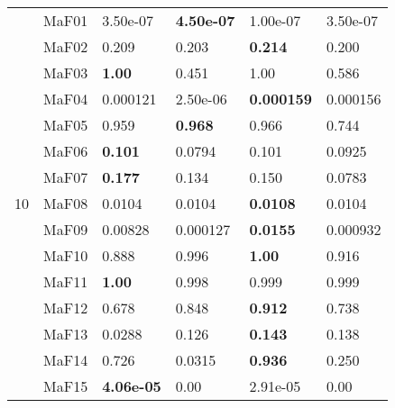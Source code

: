 \documentclass[]{article}
\begin{document}
\begin{table}
\begin{footnotesize}
\begin{tabular}{|l|l|l|l|l|l|}
\multirow{15}{*}{10} & MaF01 & \cellcolor{gray95} 3.50e-07 & \cellcolor{gray95} {\bf 4.50e-07} & \cellcolor{gray95} 1.00e-07 & \cellcolor{gray95} 3.50e-07\\
 & MaF02 & \cellcolor{gray95} 0.209 & 0.203 & \cellcolor{gray95} {\bf 0.214} & 0.200\\
 & MaF03 & \cellcolor{gray95} {\bf 1.00} & 0.451 & \cellcolor{gray95} 1.00 & 0.586\\
 & MaF04 & \cellcolor{gray95} 0.000121 & 2.50e-06 & \cellcolor{gray95} {\bf 0.000159} & \cellcolor{gray95} 0.000156\\
 & MaF05 & 0.959 & \cellcolor{gray95} {\bf 0.968} & \cellcolor{gray95} 0.966 & 0.744\\
 & MaF06 & \cellcolor{gray95} {\bf 0.101} & 0.0794 & \cellcolor{gray95} 0.101 & 0.0925\\
 & MaF07 & \cellcolor{gray95} {\bf 0.177} & 0.134 & 0.150 & 0.0783\\
 & MaF08 & \cellcolor{gray95} 0.0104 & 0.0104 & \cellcolor{gray95} {\bf 0.0108} & 0.0104\\
 & MaF09 & \cellcolor{gray95} 0.00828 & 0.000127 & \cellcolor{gray95} {\bf 0.0155} & 0.000932\\
 & MaF10 & 0.888 & 0.996 & \cellcolor{gray95} {\bf 1.00} & 0.916\\
 & MaF11 & \cellcolor{gray95} {\bf 1.00} & 0.998 & 0.999 & 0.999\\
 & MaF12 & 0.678 & 0.848 & \cellcolor{gray95} {\bf 0.912} & 0.738\\
 & MaF13 & 0.0288 & 0.126 & \cellcolor{gray95} {\bf 0.143} & 0.138\\
 & MaF14 & \cellcolor{gray95} 0.726 & 0.0315 & \cellcolor{gray95} {\bf 0.936} & 0.250\\
 & MaF15 & \cellcolor{gray95} {\bf 4.06e-05} & 0.00 & \cellcolor{gray95} 2.91e-05 & 0.00\\
\hline


\end{tabular}
\end{footnotesize}
\end{table}
\end{document}
